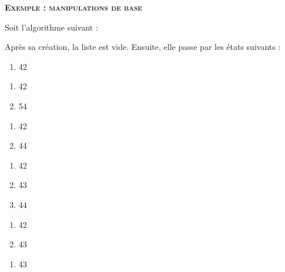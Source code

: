\clearpage

{\sffamily\bfseries\scshape
	Exemple : manipulations de base}

Soit l'algorithme suivant :

\begin{algo}
\end{algo}

Après sa création, la liste est vide.
Ensuite, elle passe par les états suivants :

\begin{minipage}[t]{2cm}
	\begin{enumerate}[start=0]
		\item 42
	\end{enumerate}
\end{minipage}
\begin{minipage}[t]{2cm}
	\begin{enumerate}[start=0]
		\item 42
		\item 54
	\end{enumerate}
\end{minipage}
\begin{minipage}[t]{2cm}
	\begin{enumerate}[start=0]
		\item 42
		\item 44
	\end{enumerate}
\end{minipage}
\begin{minipage}[t]{2cm}
	\begin{enumerate}[start=0]
		\item 42
		\item 43
		\item 44
	\end{enumerate}
\end{minipage}
\begin{minipage}[t]{2cm}
	\begin{enumerate}[start=0]
		\item 42
		\item 43
	\end{enumerate}
\end{minipage}
\begin{minipage}[t]{2cm}
	\begin{enumerate}[start=0]
		\item 43
	\end{enumerate}
\end{minipage}

